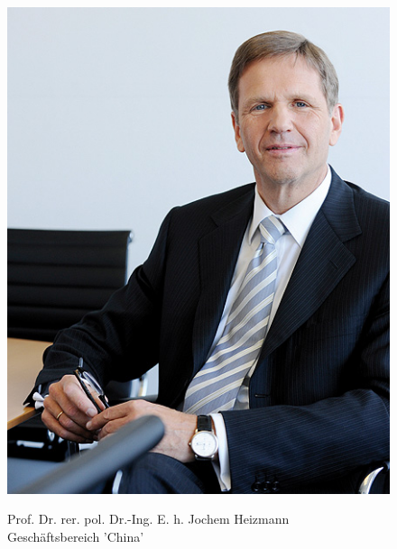\documentclass[12pt]{article}
\begin{document}
\begin{figure}[here!]
	\centering
	\begin{minipage}[h]{0.20\textwidth}
		\centering
		\includegraphics[width=1.0\textwidth]{images/JochemHeizmann.jpg}
		\label{fig:vorstandvw2}
		\cite{jhpic}
	\end{minipage}
	\begin{minipage}[h]{0.10\textwidth}
		\hspace{1cm} 
	\end{minipage}
	\begin{minipage}[h]{0.65\textwidth}
		Prof. Dr. rer. pol. Dr.-Ing. E. h. Jochem Heizmann\\
		Geschäftsbereich 'China'
	\end{minipage}
\end{figure}
\end{document}
